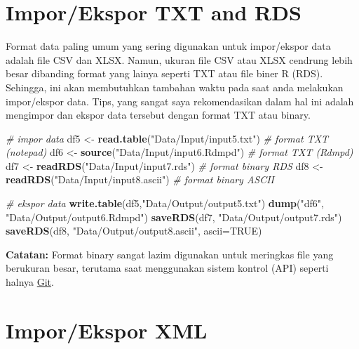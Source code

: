\documentclass[
]{book}
\newenvironment{Shaded}{\begin{snugshade}}{\end{snugshade}}
\newcommand{\AttributeTok}[1]{\textcolor[rgb]{0.13,0.29,0.53}{#1}}
\newcommand{\CommentTok}[1]{\textcolor[rgb]{0.56,0.35,0.01}{\textit{#1}}}
\newcommand{\ConstantTok}[1]{\textcolor[rgb]{0.56,0.35,0.01}{#1}}
\newcommand{\FunctionTok}[1]{\textcolor[rgb]{0.13,0.29,0.53}{\textbf{#1}}}
\newcommand{\NormalTok}[1]{#1}
\newcommand{\OtherTok}[1]{\textcolor[rgb]{0.56,0.35,0.01}{#1}}
\newcommand{\StringTok}[1]{\textcolor[rgb]{0.31,0.60,0.02}{#1}}
\begin{document}
\hypertarget{imporekspor-txt-and-rds}{%
\section{Impor/Ekspor TXT and RDS}\label{imporekspor-txt-and-rds}}

Format data paling umum yang sering digunakan untuk impor/ekspor data adalah file CSV dan XLSX. Namun, ukuran file CSV atau XLSX cendrung lebih besar dibanding format yang lainya seperti TXT atau file biner R (RDS). Sehingga, ini akan membutuhkan tambahan waktu pada saat anda melakukan impor/ekspor data. Tips, yang sangat saya rekomendasikan dalam hal ini adalah mengimpor dan ekspor data tersebut dengan format TXT atau binary.

\begin{Shaded}
\begin{Highlighting}[]
\CommentTok{\# impor data}
\NormalTok{df5 }\OtherTok{\textless{}{-}} \FunctionTok{read.table}\NormalTok{(}\StringTok{"Data/Input/input5.txt"}\NormalTok{)       }\CommentTok{\# format TXT (notepad)}
\NormalTok{df6 }\OtherTok{\textless{}{-}} \FunctionTok{source}\NormalTok{(}\StringTok{"Data/Input/input6.Rdmpd"}\NormalTok{)         }\CommentTok{\# format TXT (Rdmpd)}
\NormalTok{df7 }\OtherTok{\textless{}{-}} \FunctionTok{readRDS}\NormalTok{(}\StringTok{"Data/Input/input7.rds"}\NormalTok{)          }\CommentTok{\# format binary RDS }
\NormalTok{df8 }\OtherTok{\textless{}{-}} \FunctionTok{readRDS}\NormalTok{(}\StringTok{"Data/Input/input8.ascii"}\NormalTok{)        }\CommentTok{\# format binary ASCII }

\CommentTok{\# ekspor data}
\FunctionTok{write.table}\NormalTok{(df5,}\StringTok{"Data/Output/output5.txt"}\NormalTok{)                }
\FunctionTok{dump}\NormalTok{(}\StringTok{"df6"}\NormalTok{, }\StringTok{"Data/Output/output6.Rdmpd"}\NormalTok{)                    }
\FunctionTok{saveRDS}\NormalTok{(df7, }\StringTok{"Data/Output/output7.rds"}\NormalTok{)                      }
\FunctionTok{saveRDS}\NormalTok{(df8, }\StringTok{"Data/Output/output8.ascii"}\NormalTok{, }\AttributeTok{ascii=}\ConstantTok{TRUE}\NormalTok{)             }
\end{Highlighting}
\end{Shaded}

\textbf{Catatan:} Format binary sangat lazim digunakan untuk meringkas file yang berukuran besar, terutama saat menggunakan sistem kontrol (API) seperti halnya \href{https://git-scm.com/}{Git}.

\hypertarget{imporekspor-xml}{%
\section{Impor/Ekspor XML}\label{imporekspor-xml}}
\end{document}
